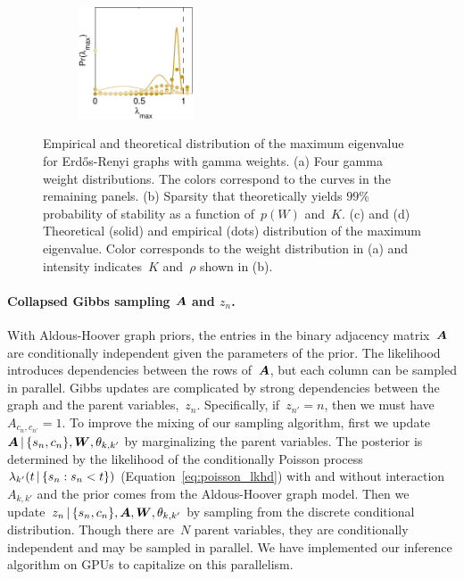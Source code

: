 \begin{figure}[!ht]
\begin{center}
\begin{subfigure}[b]{.22\textwidth}
\includegraphics[height=1.3in]{figures/ch2/stability_8_12} 
\end{subfigure}
\end{center}
\vspace{-1em}
\caption[Distribution of the maximum eigenvalue for Erd\H{o}s-Renyi graphs with gamma weights]{Empirical and theoretical distribution of the maximum eigenvalue for Erd\H{o}s-Renyi graphs with gamma weights. (a) Four gamma weight distributions. The colors correspond to the curves in the remaining panels. (b) Sparsity that theoretically yields ${99\%}$ probability of stability as a function of~${p(W)}$ and~$K$. (c) and (d) Theoretical (solid) and empirical (dots) distribution of the maximum eigenvalue. Color corresponds to the weight distribution in (a) and intensity indicates~$K$ and~$\rho$ shown in (b).}
\label{fig:stability}
\vspace{-1em}
\end{figure}

\paragraph{Collapsed Gibbs sampling $\boldsymbol{A}$ and $z_n$.}
With Aldous-Hoover graph priors, the entries in the binary adjacency matrix~$\boldsymbol{A}$ are conditionally independent given the parameters of the prior. The likelihood introduces dependencies between the rows of~$\boldsymbol{A}$, but each column can be sampled in parallel. Gibbs updates are complicated by strong dependencies between the graph and the parent variables,~$z_n$. Specifically, if~${z_{n'}=n}$, then we must have~${A_{c_{n},c_{n'}}=1}$. To improve the mixing of our sampling algorithm, first we update~${\boldsymbol{A}\,|\,\{s_n,c_n\},\boldsymbol{W},\theta_{k,k'}}$ by marginalizing the parent variables. The posterior is determined by the likelihood of the conditionally Poisson process~${\lambda_{k'}(t\,|\,\{s_n:s_n<t\})}$ (Equation~\ref{eq:poisson_lkhd}) with and without interaction~${A_{k,k'}}$ and the prior comes from the Aldous-Hoover graph model. Then we update~${z_n\,|\,\{s_n,c_n\},\boldsymbol{A},\boldsymbol{W},\theta_{k,k'}}$ by sampling from the discrete conditional distribution. Though there are~$N$ parent variables, they are conditionally independent and may be sampled in parallel. We have implemented our inference algorithm on GPUs to capitalize on this parallelism.

